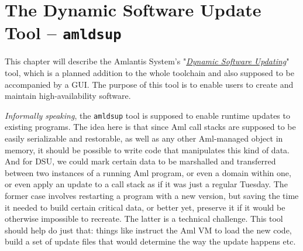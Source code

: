 
\chapter[The Dynamic Software Update Tool -- amldsup]{The Dynamic Software Update Tool -- \lstinline!amldsup!}
\label{ch:tools-amldsup}

This chapter will describe the Amlantis System's "\href{https://en.wikipedia.org/wiki/Dynamic_software_updating#Implementation}{{\em Dynamic Software Updating}}" tool, which is a planned addition to the whole toolchain and also supposed to be accompanied by a GUI. The purpose of this tool is to enable users to create and maintain high-availability software. 

{\em Informally speaking}, the \lstinline!amldsup! tool is supposed to enable runtime updates to existing programs. The idea here is that since Aml call stacks are supposed to be easily serializable and restorable, as well as any other Aml-managed object in memory, it should be possible to write code that manipulates this kind of data. And for DSU, we could mark certain data to be marshalled and transferred between two instances of a running Aml program, or even a domain within one, or even apply an update to a call stack as if it was just a regular Tuesday. The former case involves restarting a program with a new version, but saving the time it needed to build certain critical data, or better yet, preserve it if it would be otherwise impossible to recreate. The latter is a technical challenge. This tool should help do just that: things like instruct the Aml VM to load the new code, build a set of update files that would determine the way the update happens etc.





